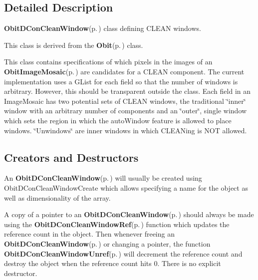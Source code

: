 

\subsection{Detailed Description}
{\bf Obit\-DCon\-Clean\-Window}{\rm (p.\,\pageref{structObitDConCleanWindow})} class defining CLEAN windows. 

This class is derived from the {\bf Obit}{\rm (p.\,\pageref{structObit})} class.

This class contains specifications of which pixels in the images of an {\bf Obit\-Image\-Mosaic}{\rm (p.\,\pageref{structObitImageMosaic})} are candidates for a CLEAN component. The current implementation uses a GList for each field so that the number of windows is arbitrary. However, this should be transparent outside the class. Each field in an Image\-Mosaic has two potential sets of CLEAN windows, the traditional \char`\"{}inner\char`\"{} window with an arbitrary number of components and an \char`\"{}outer\char`\"{}, single window which sets the region in which the auto\-Window feature is allowed to place windows. \char`\"{}Unwindows\char`\"{} are inner windows in which CLEANing is NOT allowed.\subsection{Creators and Destructors}\label{ObitDConCleanWindow_8h_ObitDConCleanWindowaccess}
An {\bf Obit\-DCon\-Clean\-Window}{\rm (p.\,\pageref{structObitDConCleanWindow})} will usually be created using Obit\-DCon\-Clean\-Window\-Create which allows specifying a name for the object as well as dimensionality of the array.

A copy of a pointer to an {\bf Obit\-DCon\-Clean\-Window}{\rm (p.\,\pageref{structObitDConCleanWindow})} should always be made using the {\bf Obit\-DCon\-Clean\-Window\-Ref}{\rm (p.\,\pageref{ObitDConCleanWindow_8h_a1})} function which updates the reference count in the object. Then whenever freeing an {\bf Obit\-DCon\-Clean\-Window}{\rm (p.\,\pageref{structObitDConCleanWindow})} or changing a pointer, the function {\bf Obit\-DCon\-Clean\-Window\-Unref}{\rm (p.\,\pageref{ObitDConCleanWindow_8h_a0})} will decrement the reference count and destroy the object when the reference count hits 0. There is no explicit destructor.

